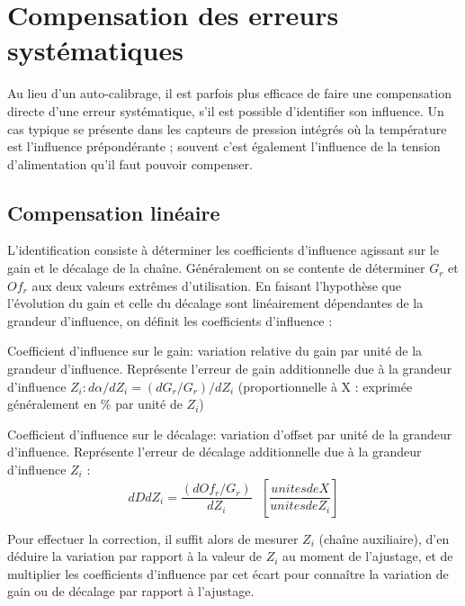\documentclass[main.tex]{subfiles}
\begin{document}
\section{Compensation des erreurs systématiques}

Au lieu d'un auto-calibrage, il est parfois plus efficace de faire une compensation directe d'une erreur systématique, s'il est possible d'identifier son influence. Un cas typique se présente dans les capteurs de pression intégrés où la température est l'influence prépondérante ; souvent c'est également l'influence de la tension d'alimentation qu'il faut pouvoir compenser.

\subsection{Compensation linéaire }
L'identification consiste à déterminer les coefficients d'influence agissant sur le gain et le décalage de la chaîne. Généralement on se contente de déterminer $G_r$ et $Of_r$ aux deux valeurs extrêmes d'utilisation. En faisant l'hypothèse que l'évolution du gain et celle du décalage sont linéairement dépendantes de la grandeur d'influence, on définit les coefficients d'influence :

\begin{definition}
   Coefficient d'influence sur le gain: variation relative du gain par unité de la grandeur d'influence. Représente l'erreur de gain additionnelle due à la grandeur d'influence $Z_i : d\alpha / dZ_i = (dG_r/G_r)/dZ_i$ (proportionnelle à X : exprimée généralement en \% par unité de $Z_i$)

\end{definition}
\begin{definition}
	Coefficient d'influence sur le décalage: variation d'offset par unité de la grandeur d'influence. Représente l'erreur de décalage additionnelle due à la grandeur d'influence $Z_i$ : \\
            \begin{equation}
                {dD}{dZ_i} = \frac{(dOf_r/G_r)}{dZ_i}\text{ }[\frac{unites de X}{unites de Z_i}]
            \end{equation}

\end{definition}

Pour effectuer la correction, il suffit alors de mesurer $Z_i$ (chaîne auxiliaire), d'en déduire la variation par rapport à la valeur de $Z_i$ au moment de l'ajustage, et de multiplier les coefficients d'influence par cet écart pour connaître la variation de gain ou de décalage par rapport à l'ajustage.
\end{document}
